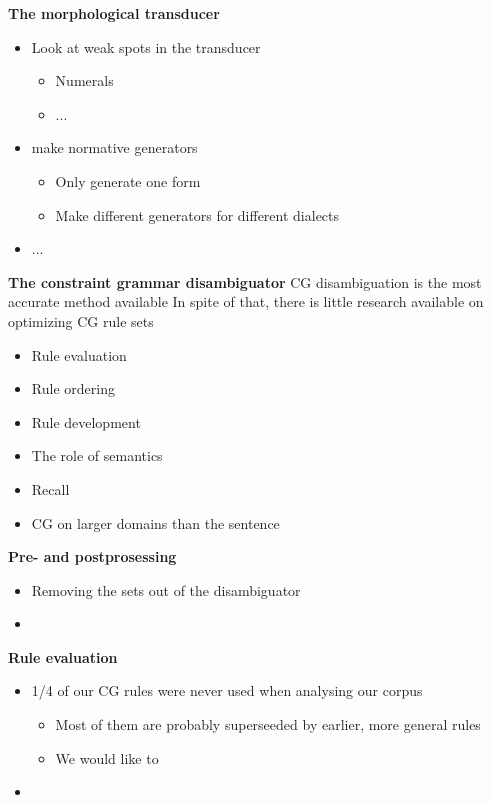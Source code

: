 \documentclass[landscape,english,11pt]{seminar}
\begin{document}
\begin{slide}
\newslide
\textbf{The morphological transducer}
\begin{itemize}
\item Look at weak spots in the transducer
\begin{itemize}
\item Numerals
\item ...
\end{itemize}
\item make normative generators
\begin{itemize}
\item Only generate one form
\item Make different generators for different dialects
\end{itemize}
\item ...
\end{itemize}


\newslide
\textbf{The constraint grammar disambiguator}
CG disambiguation is the most accurate method available In spite of that, there is little research available on optimizing CG rule sets
\begin{itemize}
\item Rule evaluation
\item Rule ordering
\item Rule development
\item The role of semantics
\item Recall
\item CG on larger domains than the sentence
\end{itemize}


\newslide
\textbf{Pre- and postprosessing}
\begin{itemize}
\item Removing the sets out of the disambiguator
\item


\end{itemize}
\newslide
\textbf{Rule evaluation}
\begin{itemize}
\item 1/4 of our CG rules were never used when analysing our corpus
\begin{itemize}
\item Most of them are probably superseeded by earlier, more general rules
\item We would like to 
\end{itemize}
\item
\end{itemize}


\end{slide}
\end{document}
